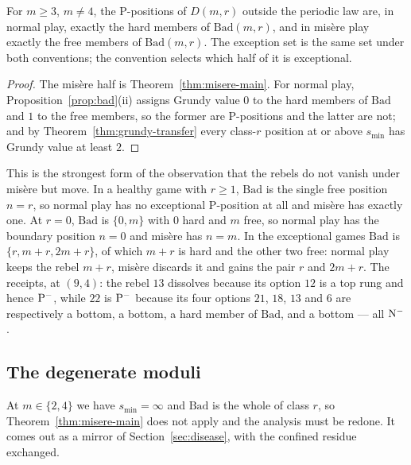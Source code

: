 \begin{corollary}\label{cor:two-conventions}
For $m \ge 3$, $m \ne 4$, the P-positions of $D(m,r)$ outside the
periodic law are, in normal play, exactly the hard members of
$\mathrm{Bad}(m,r)$, and in mis\`ere play exactly the free members of
$\mathrm{Bad}(m,r)$. The exception set is the same set under both
conventions; the convention selects which half of it is exceptional.
\end{corollary}
\begin{proof}
The mis\`ere half is Theorem~\ref{thm:misere-main}. For normal play,
Proposition~\ref{prop:bad}(ii) assigns Grundy value $0$ to the hard
members of $\mathrm{Bad}$ and $1$ to the free members, so the former are
P-positions and the latter are not; and by
Theorem~\ref{thm:grundy-transfer} every class-$r$ position at or above
$s_{\min}$ has Grundy value at least $2$.
\end{proof}

This is the strongest form of the observation that the rebels do not
vanish under mis\`ere but move. In a healthy game with $r \ge 1$,
$\mathrm{Bad}$ is the single free position $n = r$, so normal play has no
exceptional P-position at all and mis\`ere has exactly one. At $r = 0$,
$\mathrm{Bad}$ is $\{0, m\}$ with $0$ hard and $m$ free, so normal play
has the boundary position $n = 0$ and mis\`ere has $n = m$. In the
exceptional games $\mathrm{Bad}$ is $\{r, m+r, 2m+r\}$, of which $m+r$ is
hard and the other two free: normal play keeps the rebel $m + r$,
mis\`ere discards it and gains the pair $r$ and $2m + r$. The receipts,
at $(9,4)$: the rebel $13$ dissolves because its option $12$ is a top
rung and hence $\mathrm{P}^-$, while $22$ is $\mathrm{P}^-$ because its four options
$21$, $18$, $13$ and $6$ are respectively a bottom, a bottom, a hard
member of $\mathrm{Bad}$, and a bottom --- all $\mathrm{N}^-$.

\subsection{The degenerate moduli}\label{sec:misere-degenerate}

At $m \in \{2, 4\}$ we have $s_{\min} = \infty$ and $\mathrm{Bad}$ is the
whole of class $r$, so Theorem~\ref{thm:misere-main} does not apply and
the analysis must be redone. It comes out as a mirror of
Section~\ref{sec:disease}, with the confined residue exchanged.


